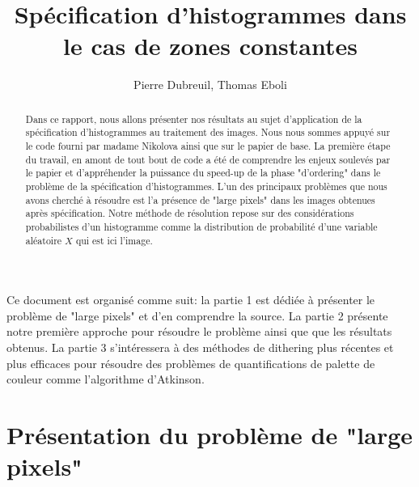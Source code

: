 \documentclass{article}
\title{Spécification d'histogrammes dans le cas de zones constantes}
\author{Pierre Dubreuil, Thomas Eboli}
\begin{document}
\maketitle

\begin{abstract}
Dans ce rapport, nous allons présenter nos résultats au sujet d'application de la spécification d'histogrammes au traitement des images. Nous nous sommes appuyé sur le code fourni par madame Nikolova ainsi que sur le papier de base. La première étape du travail, en amont de tout bout de code a été de comprendre les enjeux soulevés par le papier et d'appréhender la puissance du speed-up de la phase "d'ordering" dans le problème de la spécification d'histogrammes. L'un des principaux problèmes que nous avons cherché à résoudre est l'a présence de "large pixels" dans les images obtenues après spécification. Notre méthode de résolution repose sur des considérations probabilistes d'un histogramme comme la distribution de probabilité d'une variable aléatoire $X$ qui est ici l'image.
\end{abstract}

\paragraph*{}
Ce document est organisé comme suit: la partie 1 est dédiée à présenter le problème de "large pixels" et d'en comprendre la source. La partie 2 présente notre première approche pour résoudre le problème ainsi que que les résultats obtenus. La partie 3 s'intéressera à des méthodes de dithering plus récentes et plus efficaces pour résoudre des problèmes de quantifications de palette de couleur comme l'algorithme d'Atkinson. 

\section*{Présentation du problème de "large pixels"}
\end{document}
